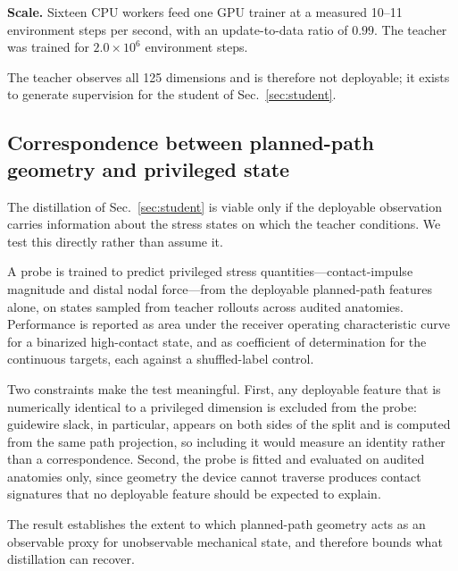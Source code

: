 \textbf{Scale.} Sixteen CPU workers feed one GPU trainer at a measured 10--11 environment steps
per second, with an update-to-data ratio of $0.99$. The teacher was trained for
$2.0 \times 10^{6}$ environment steps.

The teacher observes all 125 dimensions and is therefore not deployable; it exists to generate
supervision for the student of Sec.~\ref{sec:student}.

\subsection{Correspondence between planned-path geometry and privileged state}
\label{sec:correspondence}


The distillation of Sec.~\ref{sec:student} is viable only if the deployable observation carries
information about the stress states on which the teacher conditions. We test this directly
rather than assume it.

A probe is trained to predict privileged stress quantities---contact-impulse magnitude and
distal nodal force---from the deployable planned-path features alone, on states sampled from
teacher rollouts across audited anatomies. Performance is reported as area under the receiver
operating characteristic curve for a binarized high-contact state, and as coefficient of
determination for the continuous targets, each against a shuffled-label control.

Two constraints make the test meaningful. First, any deployable feature that is numerically
identical to a privileged dimension is excluded from the probe: guidewire slack, in particular,
appears on both sides of the split and is computed from the same path projection, so including
it would measure an identity rather than a correspondence. Second, the probe is fitted and
evaluated on audited anatomies only, since geometry the device cannot traverse produces contact
signatures that no deployable feature should be expected to explain.

The result establishes the extent to which planned-path geometry acts as an observable proxy for
unobservable mechanical state, and therefore bounds what distillation can recover.

